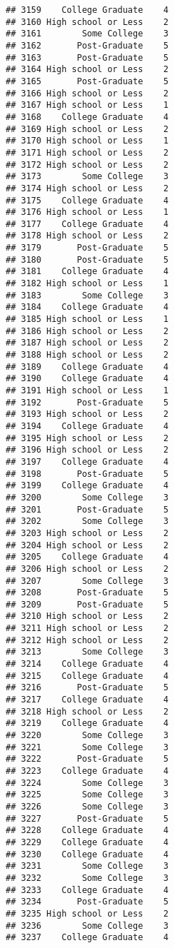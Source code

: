 \documentclass[
]{article}
\begin{document}
\begin{verbatim}
## 3159    College Graduate    4
## 3160 High school or Less    2
## 3161        Some College    3
## 3162       Post-Graduate    5
## 3163       Post-Graduate    5
## 3164 High school or Less    2
## 3165       Post-Graduate    5
## 3166 High school or Less    2
## 3167 High school or Less    1
## 3168    College Graduate    4
## 3169 High school or Less    2
## 3170 High school or Less    1
## 3171 High school or Less    2
## 3172 High school or Less    2
## 3173        Some College    3
## 3174 High school or Less    2
## 3175    College Graduate    4
## 3176 High school or Less    1
## 3177    College Graduate    4
## 3178 High school or Less    2
## 3179       Post-Graduate    5
## 3180       Post-Graduate    5
## 3181    College Graduate    4
## 3182 High school or Less    1
## 3183        Some College    3
## 3184    College Graduate    4
## 3185 High school or Less    1
## 3186 High school or Less    2
## 3187 High school or Less    2
## 3188 High school or Less    2
## 3189    College Graduate    4
## 3190    College Graduate    4
## 3191 High school or Less    1
## 3192       Post-Graduate    5
## 3193 High school or Less    2
## 3194    College Graduate    4
## 3195 High school or Less    2
## 3196 High school or Less    2
## 3197    College Graduate    4
## 3198       Post-Graduate    5
## 3199    College Graduate    4
## 3200        Some College    3
## 3201       Post-Graduate    5
## 3202        Some College    3
## 3203 High school or Less    2
## 3204 High school or Less    2
## 3205    College Graduate    4
## 3206 High school or Less    2
## 3207        Some College    3
## 3208       Post-Graduate    5
## 3209       Post-Graduate    5
## 3210 High school or Less    2
## 3211 High school or Less    2
## 3212 High school or Less    2
## 3213        Some College    3
## 3214    College Graduate    4
## 3215    College Graduate    4
## 3216       Post-Graduate    5
## 3217    College Graduate    4
## 3218 High school or Less    2
## 3219    College Graduate    4
## 3220        Some College    3
## 3221        Some College    3
## 3222       Post-Graduate    5
## 3223    College Graduate    4
## 3224        Some College    3
## 3225        Some College    3
## 3226        Some College    3
## 3227       Post-Graduate    5
## 3228    College Graduate    4
## 3229    College Graduate    4
## 3230    College Graduate    4
## 3231        Some College    3
## 3232        Some College    3
## 3233    College Graduate    4
## 3234       Post-Graduate    5
## 3235 High school or Less    2
## 3236        Some College    3
## 3237    College Graduate    4

\end{verbatim}
\end{document}
